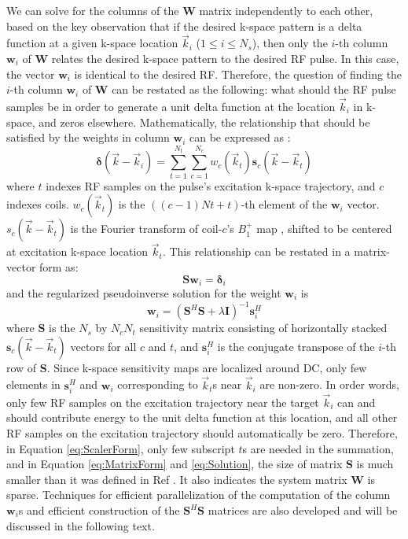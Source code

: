 \par We can solve for the columns of the $\mathbf{W}$ matrix independently to each other, based on the key observation that if the desired k-space pattern is a delta function at a given k-space location $\vec{k}_i$ ($1\leq i \leq N_s$), then only the $i$-th column $\mathbf{w}_i$ of $\mathbf{W}$ relates the desired k-space pattern to the desired RF pulse. In this case, the vector $\mathbf{w}_i$ is identical to the desired RF. Therefore, the question of finding the $i$-th column $\mathbf{w}_i$ of $\mathbf{W}$ can be restated as the following: what should the RF pulse samples be in order to generate a unit delta function at the location $\vec{k}_i$ in k-space, and zeros elsewhere. Mathematically, the relationship that should be satisfied by the weights in column $\mathbf{w}_i$  can be expressed as \cite{katscher2003transmit}:   
\begin{equation}\label{eq:ScalerForm}
\mathbf{\delta}(\vec{k}-\vec{k}_i)=\sum_{t=1}^{N_t}\sum_{c=1}^{N_c}w_c(\vec{k}_t)\mathbf{s}_c(\vec{k}-\vec{k}_t)
\end{equation}
where $t$ indexes RF samples on the pulse’s excitation k-space trajectory, and $c$ indexes coils. $w_c(\vec{k}_t)$ is the $((c-1)Nt+t)$-th element of the $\mathbf{w}_i$ vector. $s_c(\vec{k}-\vec{k}_t)$ is the Fourier transform of coil-$c$'s $B_1^+$ map , shifted to be centered at excitation k-space location $\vec{k}_t$. 
This relationship can be restated in a matrix-vector form as:                                       
\begin{equation}\label{eq:MatrixForm}
\mathbf{Sw}_i=\mathbf{\delta}_i
\end{equation}
and the regularized pseudoinverse solution for the weight $\mathbf{w}_i$ is                       
\begin{equation}\label{eq:Solution}
\mathbf{w}_i=\left( \mathbf{S}^{H} \mathbf{S} + \lambda \mathbf{I} \right) ^{-1} \mathbf{s}_i^{H}
\end{equation}
where $\mathbf{S}$ is the $N_s$ by $N_cN_t$ sensitivity matrix consisting of horizontally stacked $\mathbf{s}_c(\vec{k}-\vec{k}_t)$ vectors for all $c$ and $t$, and $\mathbf{s}_i^{H}$ is the conjugate transpose of the $i$-th row of $\mathbf{S}$. Since k-space sensitivity maps are localized around DC, only few elements in $\mathbf{s}_i^{H}$ and $\mathbf{w}_i$ corresponding to $\vec{k}_t$s near $\vec{k}_i$ are non-zero. In order words, only few RF samples on the excitation trajectory near the target $\vec{k}_i$ can and should contribute energy to the unit delta function at this location, and all other RF samples on the excitation trajectory should automatically be zero. Therefore, in Equation \ref{eq:ScalerForm}, only few subscript $t$s are needed in the summation, and in Equation \ref{eq:MatrixForm} and \ref{eq:Solution}, the size of matrix $\mathbf{S}$ is much smaller than it was defined in Ref \cite{katscher2003transmit}. It also indicates the system matrix $\mathbf{W}$ is sparse. 
Techniques for efficient parallelization of the computation of the column $\mathbf{w}_i$s and efficient construction of the $\mathbf{S}^{H}\mathbf{S}$ matrices are also developed and will be discussed in the following text.


